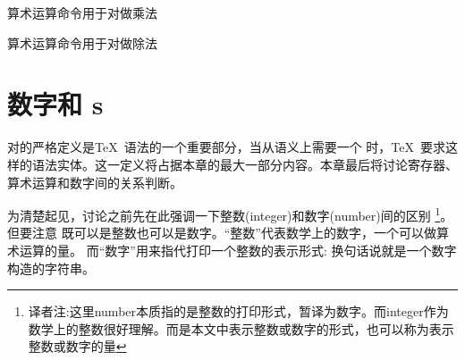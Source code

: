 \documentclass{book}
\begin{document}
\begin{inventory}
\item [\cs{multiply}]
      算术运算命令用于对做乘法

\item [\cs{divide}]
      算术运算命令用于对做除法

\end{inventory}


\section{数字和 s}


对的严格定义是\TeX\ 语法的一个重要部分，当从语义上需要一个
时，\TeX\ 要求这样的语法实体。这一定义将占据本章的最大一部分内容。本章最后将讨论寄存器、算术运算和数字间的关系判断。 


为清楚起见，讨论之前先在此强调一下整数(integer)和数字(number)间的区别
\footnote{译者注:这里number本质指的是整数的打印形式，暂译为数字。而integer作为数学上的整数很好理解。而是本文中表示整数或数字的形式，也可以称为表示整数或数字的量}。
但要注意
既可以是整数也可以是数字。“整数”代表数学上的数字，一个可以做算术运算的量。
而“数字”用来指代打印一个整数的表示形式: 换句话说就是一个数字构造的字符串。
\end{document}
